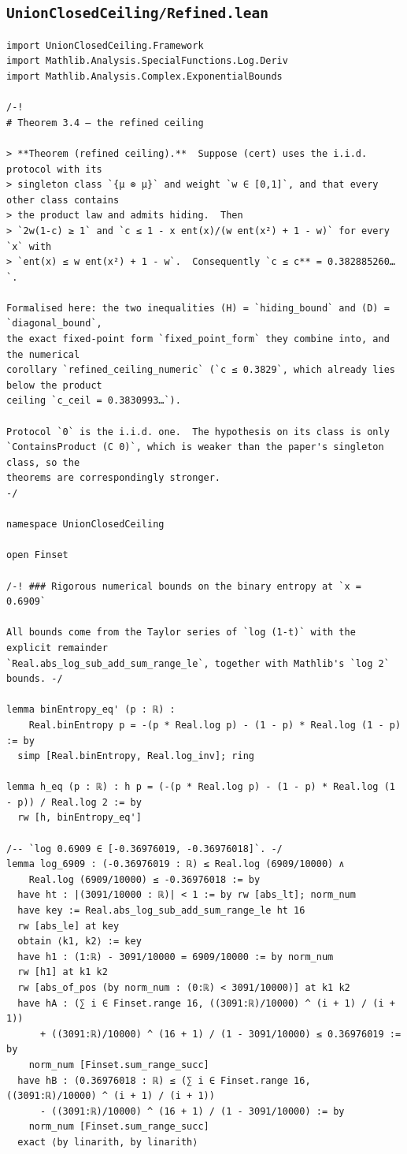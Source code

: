 \documentclass[11pt,a4paper]{article}
\theoremstyle{definition}
\theoremstyle{remark}
\begin{document}
\subsection{\texttt{UnionClosedCeiling/Refined.lean}}
\begin{Verbatim}[fontsize=\scriptsize,formatcom=\leanmono,samepage=false]
import UnionClosedCeiling.Framework
import Mathlib.Analysis.SpecialFunctions.Log.Deriv
import Mathlib.Analysis.Complex.ExponentialBounds

/-!
# Theorem 3.4 — the refined ceiling

> **Theorem (refined ceiling).**  Suppose (cert) uses the i.i.d. protocol with its
> singleton class `{μ ⊗ μ}` and weight `w ∈ [0,1]`, and that every other class contains
> the product law and admits hiding.  Then
> `2w(1-c) ≥ 1` and `c ≤ 1 - x ent(x)/(w ent(x²) + 1 - w)` for every `x` with
> `ent(x) ≤ w ent(x²) + 1 - w`.  Consequently `c ≤ c** = 0.382885260…`.

Formalised here: the two inequalities (H) = `hiding_bound` and (D) = `diagonal_bound`,
the exact fixed-point form `fixed_point_form` they combine into, and the numerical
corollary `refined_ceiling_numeric` (`c ≤ 0.3829`, which already lies below the product
ceiling `c_ceil = 0.3830993…`).

Protocol `0` is the i.i.d. one.  The hypothesis on its class is only
`ContainsProduct (C 0)`, which is weaker than the paper's singleton class, so the
theorems are correspondingly stronger.
-/

namespace UnionClosedCeiling

open Finset

/-! ### Rigorous numerical bounds on the binary entropy at `x = 0.6909`

All bounds come from the Taylor series of `log (1-t)` with the explicit remainder
`Real.abs_log_sub_add_sum_range_le`, together with Mathlib's `log 2` bounds. -/

lemma binEntropy_eq' (p : ℝ) :
    Real.binEntropy p = -(p * Real.log p) - (1 - p) * Real.log (1 - p) := by
  simp [Real.binEntropy, Real.log_inv]; ring

lemma h_eq (p : ℝ) : h p = (-(p * Real.log p) - (1 - p) * Real.log (1 - p)) / Real.log 2 := by
  rw [h, binEntropy_eq']

/-- `log 0.6909 ∈ [-0.36976019, -0.36976018]`. -/
lemma log_6909 : (-0.36976019 : ℝ) ≤ Real.log (6909/10000) ∧
    Real.log (6909/10000) ≤ -0.36976018 := by
  have ht : |(3091/10000 : ℝ)| < 1 := by rw [abs_lt]; norm_num
  have key := Real.abs_log_sub_add_sum_range_le ht 16
  rw [abs_le] at key
  obtain ⟨k1, k2⟩ := key
  have h1 : (1:ℝ) - 3091/10000 = 6909/10000 := by norm_num
  rw [h1] at k1 k2
  rw [abs_of_pos (by norm_num : (0:ℝ) < 3091/10000)] at k1 k2
  have hA : (∑ i ∈ Finset.range 16, ((3091:ℝ)/10000) ^ (i + 1) / (i + 1))
      + ((3091:ℝ)/10000) ^ (16 + 1) / (1 - 3091/10000) ≤ 0.36976019 := by
    norm_num [Finset.sum_range_succ]
  have hB : (0.36976018 : ℝ) ≤ (∑ i ∈ Finset.range 16, ((3091:ℝ)/10000) ^ (i + 1) / (i + 1))
      - ((3091:ℝ)/10000) ^ (16 + 1) / (1 - 3091/10000) := by
    norm_num [Finset.sum_range_succ]
  exact ⟨by linarith, by linarith⟩


\end{Verbatim}
\end{document}
